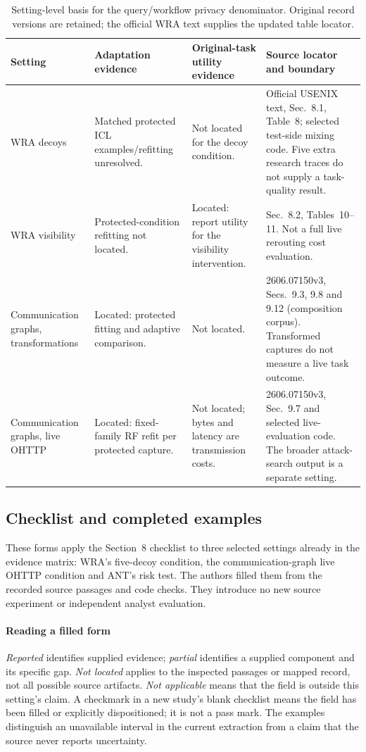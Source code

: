 \begin{table}[t]\centering\small
\caption{Setting-level basis for the query/workflow privacy denominator. Original record versions are retained; the official WRA text supplies the updated table locator.}\label{tab:availability-settings}
\begin{tabularx}{\textwidth}{@{}P{.18\textwidth}P{.21\textwidth}P{.24\textwidth}Y@{}}\toprule
Setting & Adaptation evidence & Original-task utility evidence & Source locator and boundary \\\midrule
WRA decoys & Matched protected ICL examples/refitting unresolved. & Not located for the decoy condition. & Official USENIX text, Sec.~8.1, Table~8; selected test-side mixing code. Five extra research traces do not supply a task-quality result. \\\addlinespace[3pt]
WRA visibility & Protected-condition refitting not located. & Located: report utility for the visibility intervention. & Sec.~8.2, Tables~10--11. Not a full live rerouting cost evaluation. \\\addlinespace[3pt]
Communication graphs, transformations & Located: protected fitting and adaptive comparison. & Not located. & 2606.07150v3, Secs.~9.3, 9.8 and 9.12 (composition corpus). Transformed captures do not measure a live task outcome. \\\addlinespace[3pt]
Communication graphs, live OHTTP & Located: fixed-family RF refit per protected capture. & Not located; bytes and latency are transmission costs. & 2606.07150v3, Sec.~9.7 and selected live-evaluation code. The broader attack-search output is a separate setting. \\\bottomrule
\end{tabularx}\end{table}

\subsection{Checklist and completed examples}


These forms apply the Section~8 checklist to three selected settings already in the evidence matrix: WRA's five-decoy condition, the communication-graph live OHTTP condition and ANT's risk test. The authors filled them from the recorded source passages and code checks. They introduce no new source experiment or independent analyst evaluation.

\paragraph{Reading a filled form} \emph{Reported} identifies supplied evidence; \emph{partial} identifies a supplied component and its specific gap. \emph{Not located} applies to the inspected passages or mapped record, not all possible source artifacts. \emph{Not applicable} means that the field is outside this setting's claim. A checkmark in a new study's blank checklist means the field has been filled or explicitly dispositioned; it is not a pass mark. The examples distinguish an unavailable interval in the current extraction from a claim that the source never reports uncertainty.

